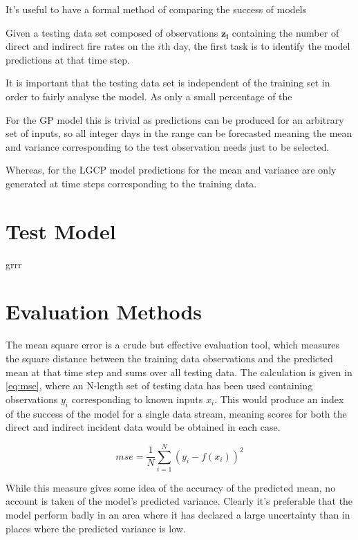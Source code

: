 \documentclass[a4paper,11pt]{report}
\begin{document}
It's useful to have a formal method of comparing the success of models

Given a testing data set composed of observations \(\mathbf{z_i}\) containing the number of direct and indirect fire rates on the \(i\)th day, the first task is to identify the model predictions at that time step.

It is important that the testing data set is independent of the training set in order to fairly analyse the model. As only a small percentage of the 

For the GP model this is trivial as predictions can be produced for an arbitrary set of inputs, so all integer days in the range can be forecasted meaning the mean and variance corresponding to the test observation needs just to be selected. 

Whereas, for the LGCP model predictions for the mean and variance are only generated at time steps corresponding to the training data. 

\section{Test Model}
grrr

\section{Evaluation Methods}
The mean square error is a crude but effective evaluation tool, which measures the square distance between the training data observations and the predicted mean at that time step and sums over all testing data. The calculation is given in \ref{eq:mse}, where an N-length set of testing data has been used containing observations \(y_i\) corresponding to known inputs \(x_i\). This would produce an index of the success of the model for a single data stream, meaning scores for both the direct and indirect incident data would be obtained in each case. 

\begin{equation} \label{eq:mse}
mse = \frac{1}{N} \sum_{i=1}^{N} (y_i - f(x_i))^2
\end{equation}

While this measure gives some idea of the accuracy of the predicted mean, no account is taken of the model's predicted variance. Clearly it's preferable that the model perform badly in an area where it has declared a large uncertainty than in places where the predicted variance is low. \par
\end{document}
